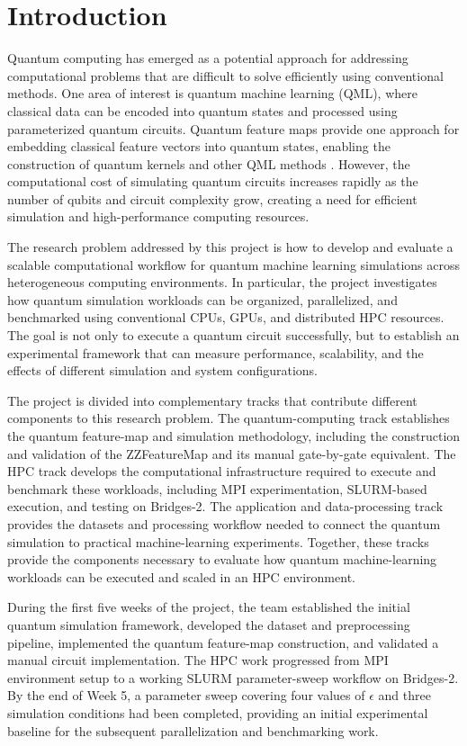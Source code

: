 \documentclass[pdflatex,sn-mathphys-num]{sn-jnl}%
\theoremstyle{thmstyleone}%
\theoremstyle{thmstyletwo}%
\theoremstyle{thmstylethree}%
\begin{document}
\section{Introduction}\label{sec1}

Quantum computing has emerged as a potential approach for addressing computational problems that are difficult to solve efficiently using conventional methods. One area of interest is quantum machine learning (QML), where classical data can be encoded into quantum states and processed using parameterized quantum circuits. Quantum feature maps provide one approach for embedding classical feature vectors into quantum states, enabling the construction of quantum kernels and other QML methods \cite{havlicek2019}. However, the computational cost of simulating quantum circuits increases rapidly as the number of qubits and circuit complexity grow, creating a need for efficient simulation and high-performance computing resources.

The research problem addressed by this project is how to develop and evaluate a scalable computational workflow for quantum machine learning simulations across heterogeneous computing environments. In particular, the project investigates how quantum simulation workloads can be organized, parallelized, and benchmarked using conventional CPUs, GPUs, and distributed HPC resources. The goal is not only to execute a quantum circuit successfully, but to establish an experimental framework that can measure performance, scalability, and the effects of different simulation and system configurations.

The project is divided into complementary tracks that contribute different components to this research problem. The quantum-computing track establishes the quantum feature-map and simulation methodology, including the construction and validation of the ZZFeatureMap and its manual gate-by-gate equivalent. The HPC track develops the computational infrastructure required to execute and benchmark these workloads, including MPI experimentation, SLURM-based execution, and testing on Bridges-2. The application and data-processing track provides the datasets and processing workflow needed to connect the quantum simulation to practical machine-learning experiments. Together, these tracks provide the components necessary to evaluate how quantum machine-learning workloads can be executed and scaled in an HPC environment.

During the first five weeks of the project, the team established the initial quantum simulation framework, developed the dataset and preprocessing pipeline, implemented the quantum feature-map construction, and validated a manual circuit implementation. The HPC work progressed from MPI environment setup to a working SLURM parameter-sweep workflow on Bridges-2. By the end of Week 5, a parameter sweep covering four values of $\epsilon$ and three simulation conditions had been completed, providing an initial experimental baseline for the subsequent parallelization and benchmarking work.
\end{document}
